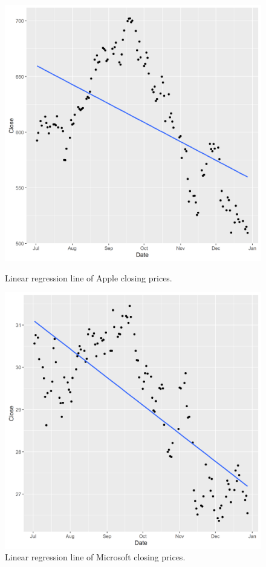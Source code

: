\documentclass[paper=a4, fontsize=11pt]{scrartcl} %
\numberwithin{equation}{section} %
\numberwithin{figure}{section} %
\numberwithin{table}{section} %
\begin{document}
\begin{figure}[!htb]
  \includegraphics[width=\linewidth]{graph/a_reg4.png}
  \caption{Linear regression line of Apple closing prices.}
\endminipage\hfill
{}
  \includegraphics[width=\linewidth]{graph/m_reg4.png}
  \caption{Linear regression line of Microsoft closing prices.}
\endminipage\hfill
\end{figure}
\end{document}
